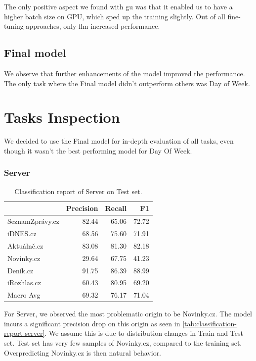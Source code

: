 The only positive aspect we found with \ac{gu} was that it enabled us to have a higher batch
size on GPU, which sped up the training slightly.
Out of all fine-tuning approaches, only \ac{flm} increased performance.

\subsection{Final model}
\label{sec:final-model-performance-on-tasks}
We observe that further enhancements of the model improved the performance.
The only task where the Final model didn't outperform others was Day of Week.

\section{Tasks Inspection}
We decided to use the Final model for in-depth evaluation of all tasks, even
though it wasn't the best performing model for Day Of Week.


\subsubsection{Server}
\label{sec:final-model-performance-on-server}
\begin{table}[H]
    \centering\footnotesize\sf
    \begin{tabular}{lrrr}
        \toprule
        {}              & Precision & Recall & F1    \\
        \midrule
        SeznamZprávy.cz & 82.44     & 65.06  & 72.72 \\
        iDNES.cz        & 68.56     & 75.60  & 71.91 \\
        Aktuálně.cz     & 83.08     & 81.30  & 82.18 \\
        Novinky.cz      & 29.64     & 67.75  & 41.23 \\
        Deník.cz        & 91.75     & 86.39  & 88.99 \\
        iRozhlas.cz     & 60.43     & 80.95  & 69.20 \\
        Macro Avg       & 69.32     & 76.17  & 71.04 \\
        \bottomrule
    \end{tabular}
    \caption{Classification report of Server on Test set.}
    \label{tab:classification-report-server}
\end{table}
For Server, we observed the most problematic origin to be Novinky.cz. The model
incurs a significant precision drop on this origin as seen in \autoref{tab:classification-report-server}.
We assume this is due to distribution changes in Train and Test set.
Test set has very few samples of Novinky.cz, compared to the training set.
Overpredicting Novinky.cz is then natural behavior.

